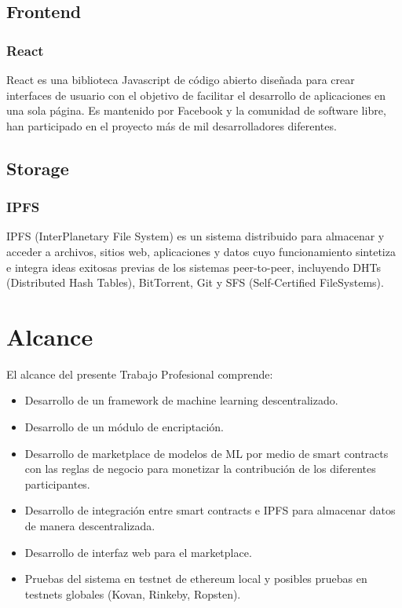 \documentclass[
11pt, %
oneside, %
spanish, %
singlespacing, %
headsepline, %
chapterinoneline, %
]{MastersDoctoralThesis} %
\begin{document}
\section{Frontend}

\subsection{React \cite{rt}}
React es una biblioteca Javascript de código abierto diseñada para crear interfaces de usuario con el objetivo de facilitar el desarrollo de aplicaciones en una sola página. Es mantenido por Facebook y la comunidad de software libre, han participado en el proyecto más de mil desarrolladores diferentes.

\section{Storage}

\subsection{IPFS \cite{ipfs}}
IPFS (InterPlanetary File System) es un sistema distribuido para almacenar y acceder a archivos, sitios web, aplicaciones y datos cuyo funcionamiento sintetiza e integra ideas exitosas previas de los sistemas peer-to-peer, incluyendo DHTs (Distributed Hash Tables),  BitTorrent, Git y SFS (Self-Certified FileSystems).

\chapter{Alcance}
El alcance del presente Trabajo Profesional comprende:

\begin{itemize}
\item Desarrollo de un framework de machine learning descentralizado.
\item Desarrollo de un módulo de encriptación.
\item Desarrollo de marketplace de modelos de ML por medio de smart contracts con las reglas de negocio para monetizar la contribución de los diferentes participantes.
\item Desarrollo de integración entre smart contracts e IPFS para almacenar datos de manera descentralizada.
\item Desarrollo de interfaz web para el marketplace.
\item Pruebas del sistema en testnet de ethereum local y posibles pruebas en testnets globales (Kovan, Rinkeby, Ropsten).
\end{itemize}
\end{document}
